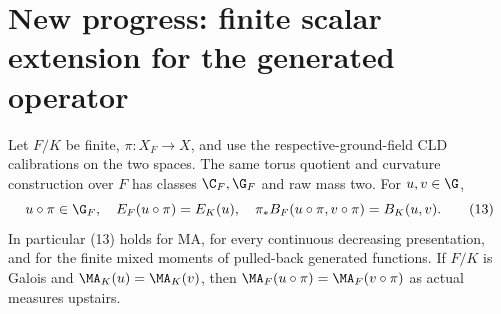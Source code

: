 \section{New progress: finite scalar extension for the generated operator}
\begin{theorem}\label{finite}
Let $F/K$ be finite, $\pi:X_F\to X$, and use the respective-ground-field
CLD calibrations on the two spaces. The same torus quotient and curvature
construction over $F$ has classes $\C_F,\G_F$ and raw mass two.
For $u,v\in\G$,
\[
 u\circ\pi\in\G_F,\quad E_F(u\circ\pi)=E_K(u),\quad
 \pi_*B_F(u\circ\pi,v\circ\pi)=B_K(u,v).                   \tag{13}
\]
In particular (13) holds for MA, for every continuous decreasing presentation,
and for the finite mixed moments of pulled-back generated functions.
If $F/K$ is Galois and $\MA_K(u)=\MA_K(v)$, then
$\MA_F(u\circ\pi)=\MA_F(v\circ\pi)$ as actual measures upstairs.
\end{theorem}

